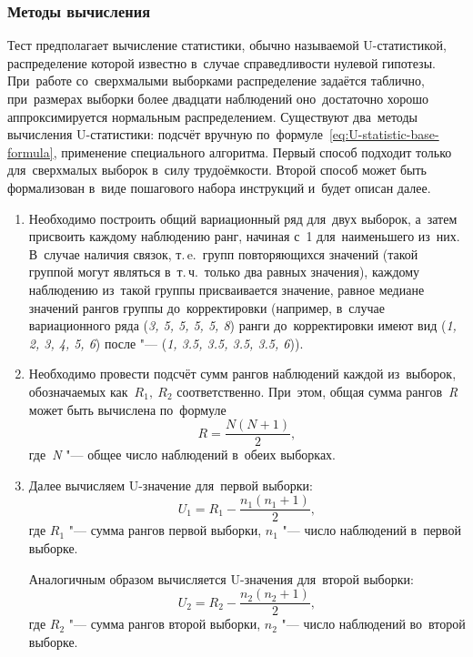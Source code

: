 \documentclass[]{scrartcl}
\begin{document}
\subsubsection{Методы вычисления}
Тест предполагает вычисление статистики, обычно называемой U-статистикой, распределение которой известно в~случае справедливости нулевой гипотезы. При~работе со~сверхмалыми выборками распределение задаётся таблично, при~размерах выборки более двадцати наблюдений оно~достаточно хорошо аппроксимируется нормальным распределением. Существуют два~методы вычисления U-статистики: подсчёт вручную по~формуле~\ref{eq:U-statistic-base-formula}, применение специального алгоритма. Первый способ подходит только для~сверхмалых выборок в~силу трудоёмкости. Второй способ может быть формализован в~виде пошагового набора инструкций и~будет описан далее.
\begin{enumerate}
	\item Необходимо построить общий вариационный ряд для~двух выборок, а~затем присвоить каждому наблюдению ранг, начиная с~1 для~наименьшего из~них. В~случае наличия связок, т.\,e.~групп повторяющихся значений (такой группой могут являться в~т.\,ч.~только два равных значения), каждому наблюдению из~такой группы присваивается значение, равное медиане значений рангов группы до~корректировки (например, в~случае вариационного ряда (\textit{3, 5, 5, 5, 5, 8}) ранги до~корректировки имеют вид (\textit{1, 2, 3, 4, 5, 6}) после "--- (\textit{1, 3.5, 3.5, 3.5, 3.5, 6})).
	\item Необходимо провести подсчёт сумм рангов наблюдений каждой из~выборок, обозначаемых как~${\textstyle R_{1},\ R_{2}}$ соответственно. При~этом, общая сумма рангов~\textit{R} может быть вычислена по~формуле
	\begin{equation}\label{eq:common-R}
	R = \frac{N(N+1)}{2},
	\end{equation}
	где~\textit{N} "--- общее число наблюдений в~обеих выборках.
	\item Далее вычисляем U-значение для~первой выборки:
	\begin{equation}\label{eq:U1}
	U_{1}=R_{1}-\frac{n_{1}(n_{1}+1)}{2},
	\end{equation}
	где ${\textstyle R_{1}}$ "--- сумма рангов первой выборки, ${\textstyle n_{1}}$ "--- число наблюдений в~первой выборке.
	
	Аналогичным образом вычисляется U-значения для~второй выборки:
	\begin{equation}\label{eq:U2}
	U_{2}=R_{2}-\frac{n_{2}(n_{2}+1)}{2},
	\end{equation}
	где ${\textstyle R_{2}}$ "--- сумма рангов второй выборки, ${\textstyle n_{2}}$ "--- число наблюдений во~второй выборке.
	

\end{enumerate}
\end{document}
